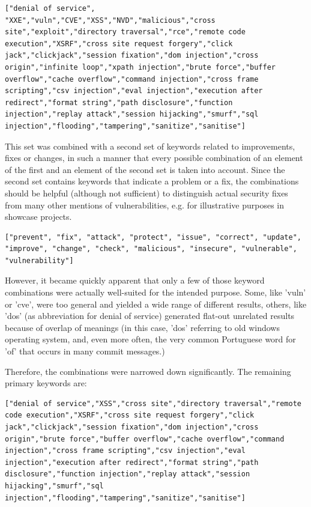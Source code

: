 \documentclass[
	a4paper,
	pagesize,
	pdftex,
	12pt,
	twoside, %
	BCOR=5mm, %
	ngerman,
	fleqn,
	final,
	]{scrartcl}
\begin{document}
\lstset{basicstyle=\small}
\begin{lstlisting}
["denial of service", "XXE","vuln","CVE","XSS","NVD","malicious","cross site","exploit","directory traversal","rce","remote code execution","XSRF","cross site request forgery","click jack","clickjack","session fixation","dom injection","cross origin","infinite loop","xpath injection","brute force","buffer overflow","cache overflow","command injection","cross frame scripting","csv injection","eval injection","execution after redirect","format string","path disclosure","function injection","replay attack","session hijacking","smurf","sql injection","flooding","tampering","sanitize","sanitise"]
\end{lstlisting}
This set was combined with a second set of keywords related to improvements, fixes or changes, in such a manner that every possible combination of an element of the first and an element of the second set is taken into account. Since the second set contains keywords that indicate a problem or a fix, the combinations should be helpful (although not sufficient) to distinguish actual security fixes from many other mentions of vulnerabilities, e.g. for illustrative purposes in showcase projects.
\begin{lstlisting}
["prevent", "fix", "attack", "protect", "issue", "correct", "update", "improve", "change", "check", "malicious", "insecure", "vulnerable", "vulnerability"]
\end{lstlisting}
However, it became quickly apparent that only a few of those keyword combinations were actually well-suited for the intended purpose. Some, like 'vuln' or 'cve', were too general and yielded a wide range of different results, others, like 'dos' (as abbreviation for denial of service) generated flat-out unrelated results because of overlap of meanings (in this case, 'dos' referring to old windows operating system, and, even more often, the very common Portuguese word for 'of' that occurs in many commit messages.)

Therefore, the combinations were narrowed down significantly. The remaining primary keywords are:
\begin{lstlisting}
["denial of service","XSS","cross site","directory traversal","remote code execution","XSRF","cross site request forgery","click jack","clickjack","session fixation","dom injection","cross origin","brute force","buffer overflow","cache overflow","command injection","cross frame scripting","csv injection","eval injection","execution after redirect","format string","path disclosure","function injection","replay attack","session hijacking","smurf","sql injection","flooding","tampering","sanitize","sanitise"]
\end{lstlisting}
\end{document}
